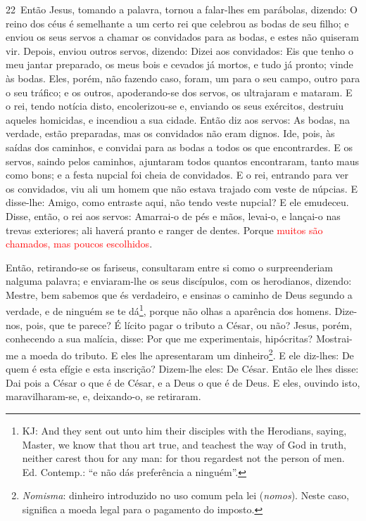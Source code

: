 \medskip

\lettrine{22}\ Então Jesus, tomando a palavra, tornou a
falar-lhes em parábolas, dizendo: O reino dos céus é semelhante
a um certo rei que celebrou as bodas de seu filho; e enviou os
seus servos a chamar os convidados para as bodas, e estes não
quiseram vir. Depois, enviou outros servos, dizendo: Dizei aos
convidados: Eis que tenho o meu jantar preparado, os meus bois e
cevados já mortos, e tudo já pronto; vinde às bodas. Eles,
porém, não fazendo caso, foram, um para o seu campo, outro para o
seu tráfico; e os outros, apoderando-se dos servos, os
ultrajaram e mataram. E o rei, tendo notícia disto,
encolerizou-se e, enviando os seus exércitos, destruiu aqueles
homicidas, e incendiou a sua cidade. Então diz aos servos: As
bodas, na verdade, estão preparadas, mas os convidados não eram
dignos. Ide, pois, às saídas dos caminhos, e convidai para as
bodas a todos os que encontrardes. E os servos, saindo pelos
caminhos, ajuntaram todos quantos encontraram, tanto maus como bons;
e a festa nupcial foi cheia de convidados. E o rei, entrando
para ver os convidados, viu ali um homem que não estava trajado com
veste de núpcias. E disse-lhe: Amigo, como entraste aqui, não
tendo veste nupcial? E ele emudeceu. Disse, então, o rei aos
servos: Amarrai-o de pés e mãos, levai-o, e lançai-o nas trevas
exteriores; ali haverá pranto e ranger de dentes. Porque
\textcolor{red}{muitos são chamados, mas poucos escolhidos}.

Então, retirando-se os fariseus, consultaram entre si como o
surpreenderiam nalguma palavra; e enviaram-lhe os seus
discípulos, com os herodianos, dizendo: Mestre, bem sabemos que és
verdadeiro, e ensinas o caminho de Deus segundo a verdade, e de
ninguém se te dá\footnote{KJ: And they sent out unto him their
disciples with the Herodians, saying, Master, we know that thou art
true, and teachest the way of God in truth, neither carest thou for
any man: for thou regardest not the person of men. Ed. Contemp.: 	``e
não dás preferência a ninguém''.}, porque não olhas a aparência dos
homens. Dize-nos, pois, que te parece? É lícito pagar o
tributo a César, ou não? Jesus, porém, conhecendo a sua
malícia, disse: Por que me experimentais, hipócritas?
Mostrai-me a moeda do tributo. E eles lhe apresentaram um
dinheiro\footnote{\emph{Nomisma}: dinheiro introduzido no uso comum
pela lei (\emph{nomos}). Neste caso, significa a moeda legal para o
pagamento do imposto.}. E ele diz-lhes: De quem é esta efígie
e esta inscrição? Dizem-lhe eles: De César. Então ele lhes
disse: Dai pois a César o que é de César, e a Deus o que é de Deus.
E eles, ouvindo isto, maravilharam-se, e, deixando-o, se
retiraram.


